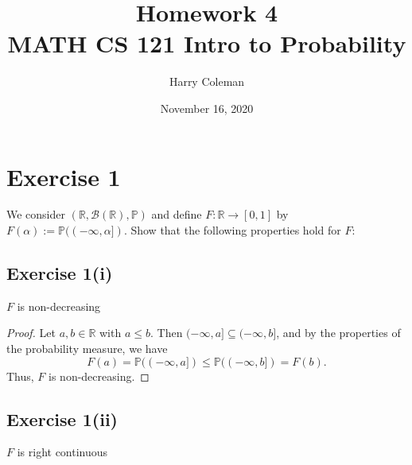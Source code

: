 \documentclass[12pt]{article}
\newenvironment{problem}
    {\begin{lrbox}{\mybox}\begin{minipage}{0.98\textwidth}}
    {\end{minipage}\end{lrbox}\framebox[\textwidth]{\usebox{\mybox}}}
\newcommand{\R}{\mathbb{R}} %
\renewcommand{\P}{\mathbb{P}} %
\newcommand{\BB}{\mathcal{B}} %
\newcommand{\<}{\left\langle} %
\renewcommand{\>}{\right\rangle} %
\begin{document}
 
\title{Homework 4\\
    \large MATH CS 121 Intro to Probability
}
\author{Harry Coleman}
\date{November 16, 2020}
\maketitle

\section*{Exercise 1}
\begin{problem}
    We consider $(\R, \BB(\R), \P)$ and define $F:\R\to[0,1]$ by $F(\alpha):=\P((-\infty,\alpha])$. Show that the following properties hold for $F$:
\end{problem}

\subsection*{Exercise 1(i)}
\begin{problem}
    $F$ is non-decreasing
\end{problem}

\begin{proof}
    Let $a,b\in\R$ with $a\leq b$. Then $(-\infty, a] \subseteq (-\infty, b]$, and by the properties of the probability measure, we have
    \[F(a) = \P((-\infty,a]) \leq \P((-\infty,b]) = F(b).\]
    Thus, $F$ is non-decreasing.
    
\end{proof}

\subsection*{Exercise 1(ii)}
\begin{problem}
    $F$ is right continuous
\end{problem}
\end{document}
